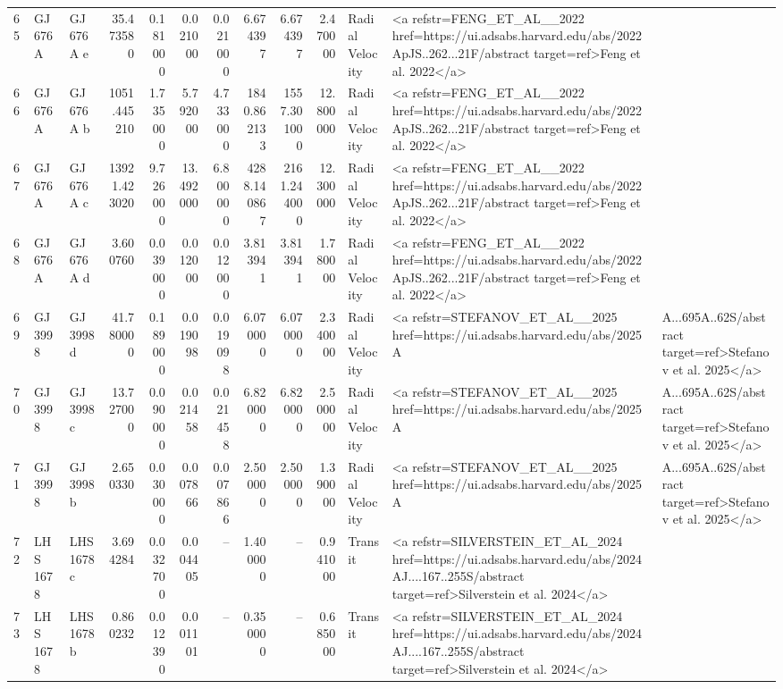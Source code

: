 \begin{tabular}{lllrrrrrrrll}
65 & GJ 676 A & GJ 676 A e & 35.473580 & 0.181000 & 0.021000 & 0.021000 & 6.674397 & 6.674397 & 2.470000 & Radial Velocity & <a refstr=FENG_ET_AL__2022 href=https://ui.adsabs.harvard.edu/abs/2022ApJS..262...21F/abstract target=ref>Feng et al. 2022</a> \\
66 & GJ 676 A & GJ 676 A b & 1051.445210 & 1.735000 & 5.792000 & 4.733000 & 1840.862133 & 1557.301000 & 12.800000 & Radial Velocity & <a refstr=FENG_ET_AL__2022 href=https://ui.adsabs.harvard.edu/abs/2022ApJS..262...21F/abstract target=ref>Feng et al. 2022</a> \\
67 & GJ 676 A & GJ 676 A c & 13921.423020 & 9.726000 & 13.492000 & 6.800000 & 4288.140867 & 2161.244000 & 12.300000 & Radial Velocity & <a refstr=FENG_ET_AL__2022 href=https://ui.adsabs.harvard.edu/abs/2022ApJS..262...21F/abstract target=ref>Feng et al. 2022</a> \\
68 & GJ 676 A & GJ 676 A d & 3.600760 & 0.039000 & 0.012000 & 0.012000 & 3.813941 & 3.813941 & 1.780000 & Radial Velocity & <a refstr=FENG_ET_AL__2022 href=https://ui.adsabs.harvard.edu/abs/2022ApJS..262...21F/abstract target=ref>Feng et al. 2022</a> \\
69 & GJ 3998 & GJ 3998 d & 41.780000 & 0.189000 & 0.019098 & 0.019098 & 6.070000 & 6.070000 & 2.340000 & Radial Velocity & <a refstr=STEFANOV_ET_AL__2025 href=https://ui.adsabs.harvard.edu/abs/2025A&A...695A..62S/abstract target=ref>Stefanov et al. 2025</a> \\
70 & GJ 3998 & GJ 3998 c & 13.727000 & 0.090000 & 0.021458 & 0.021458 & 6.820000 & 6.820000 & 2.500000 & Radial Velocity & <a refstr=STEFANOV_ET_AL__2025 href=https://ui.adsabs.harvard.edu/abs/2025A&A...695A..62S/abstract target=ref>Stefanov et al. 2025</a> \\
71 & GJ 3998 & GJ 3998 b & 2.650330 & 0.030000 & 0.007866 & 0.007866 & 2.500000 & 2.500000 & 1.390000 & Radial Velocity & <a refstr=STEFANOV_ET_AL__2025 href=https://ui.adsabs.harvard.edu/abs/2025A&A...695A..62S/abstract target=ref>Stefanov et al. 2025</a> \\
72 & LHS 1678 & LHS 1678 c & 3.694284 & 0.032700 & 0.004405 & -- & 1.400000 & -- & 0.941000 & Transit & <a refstr=SILVERSTEIN_ET_AL_2024 href=https://ui.adsabs.harvard.edu/abs/2024AJ....167..255S/abstract target=ref>Silverstein et al. 2024</a> \\
73 & LHS 1678 & LHS 1678 b & 0.860232 & 0.012390 & 0.001101 & -- & 0.350000 & -- & 0.685000 & Transit & <a refstr=SILVERSTEIN_ET_AL_2024 href=https://ui.adsabs.harvard.edu/abs/2024AJ....167..255S/abstract target=ref>Silverstein et al. 2024</a> \\

\end{tabular}
